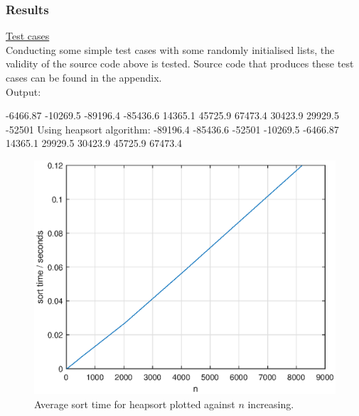 \documentclass[a4paper, 12pt]{article}
\begin{document}
\subsubsection{Results}

\underline{Test cases}\\

Conducting some simple test cases with some randomly initialised lists, the validity of the source code above is tested. Source code that produces these test cases can be found in the appendix.\\ 
Output:
\begin{spverbatim}
-6466.87 -10269.5 -89196.4 -85436.6 14365.1 45725.9 67473.4 30423.9 29929.5 -52501
 Using heapsort algorithm:
-89196.4 -85436.6 -52501 -10269.5 -6466.87 14365.1 29929.5 30423.9 45725.9 67473.4
\end{spverbatim}

\begin{figure}[H]
\centering
\includegraphics[scale = 0.75]{Heap_sort_average_time}
\caption{Average sort time for heapsort plotted against $n$ increasing.}
\end{figure}
\end{document}
